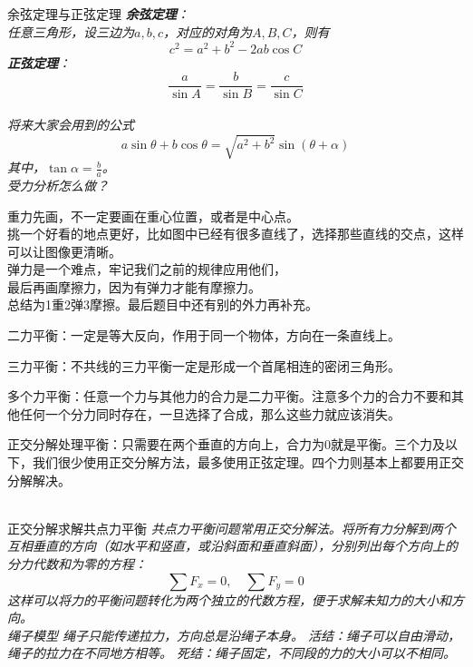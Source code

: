 \documentclass[a4paper, 12pt]{article}
\newcommand{\defitem}[2]{
\noindent \textsf{#1} \hspace{1em} \itshape{#2} \\
}
\begin{document}
\defitem{余弦定理与正弦定理}{
  \textbf{余弦定理}：\\
  任意三角形，设三边为$a,b,c$，对应的对角为$A,B,C$，则有
  \[ c^2 = a^2 + b^2 - 2ab\cos C \]
  \textbf{正弦定理}：\\
  \[ \frac{a}{\sin A} = \frac{b}{\sin B} = \frac{c}{\sin C} \]
}
\defitem{将来大家会用到的公式}{
  \[ a\sin\theta + b\cos\theta = \sqrt{a^2 + b^2}\sin(\theta + \alpha) \]
  其中，$\tan\alpha = \frac{b}{a}$。
}
\defitem{受力分析怎么做？}{重力先画，不一定要画在重心位置，或者是中心点。\\
  挑一个好看的地点更好，比如图中已经有很多直线了，选择那些直线的交点，这样可以让图像更清晰。\\
  弹力是一个难点，牢记我们之前的规律应用他们，\\
  最后再画摩擦力，因为有弹力才能有摩擦力。\\
  总结为1重2弹3摩擦。最后题目中还有别的外力再补充。

  二力平衡：一定是等大反向，作用于同一个物体，方向在一条直线上。

  三力平衡：不共线的三力平衡一定是形成一个首尾相连的密闭三角形。

  多个力平衡：任意一个力与其他力的合力是二力平衡。注意多个力的合力不要和其他任何一个分力同时存在，一旦选择了合成，那么这些力就应该消失。

  正交分解处理平衡：只需要在两个垂直的方向上，合力为0就是平衡。三个力及以下，我们很少使用正交分解方法，最多使用正弦定理。四个力则基本上都要用正交分解解决。
}

\defitem{正交分解求解共点力平衡}{
  共点力平衡问题常用正交分解法。将所有力分解到两个互相垂直的方向（如水平和竖直，或沿斜面和垂直斜面），分别列出每个方向上的分力代数和为零的方程：
  \[
    \sum F_x = 0,\quad \sum F_y = 0
  \]
  这样可以将力的平衡问题转化为两个独立的代数方程，便于求解未知力的大小和方向。
}
\defitem{绳子模型}{
  绳子只能传递拉力，方向总是沿绳子本身。
  \emph{活结}：绳子可以自由滑动，绳子的拉力在不同地方相等。
  \emph{死结}：绳子固定，不同段的力的大小可以不相同。
}
\end{document}
